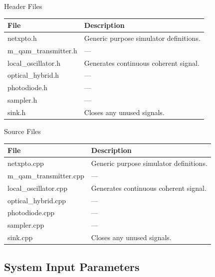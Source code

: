 Header Files
\begin{table}[H]
\centering
\begin{tabulary}{1.0\textwidth}{|L|L|}
\hline
\textbf{File}           & \textbf{Description}                           \\
\hline
netxpto.h               & Generic purpose simulator definitions.         \\
\hline
m\_qam\_transmitter.h   & ---\\
\hline
local\_oscillator.h     & Generates continuous coherent signal.            \\
\hline
optical\_hybrid.h       & ---\\
\hline
photodiode.h            & ---\\
\hline
sampler.h               & ---\\
\hline
sink.h                  & Closes any unused signals.                       \\
\hline
\end{tabulary}
\end{table}
%
%
Source Files
\begin{table}[H]
\centering
\begin{tabulary}{1.0\textwidth}{|L|L|}
\hline
\textbf{File}                   & \textbf{Description}\\
\hline
netxpto.cpp                     & Generic purpose simulator definitions.\\
\hline
m\_qam\_transmitter.cpp         & ---\\
\hline
local\_oscillator.cpp           & Generates continuous coherent signal.\\
\hline
optical\_hybrid.cpp             & ---\\
\hline
photodiode.cpp                  & ---\\
\hline
sampler.cpp                     & ---\\
\hline
sink.cpp                        & Closes any unused signals.\\
\hline
\end{tabulary}
\end{table}


\subsection*{System Input Parameters}

